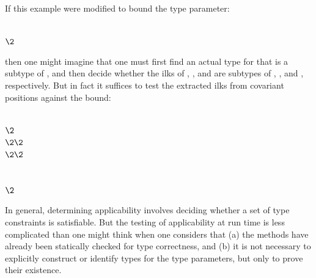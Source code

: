 If this example were modified to bound the type parameter:
\begin{codeexamplesize}
\begin{tabbing}
 \\
\(\2\)
\end{tabbing}
\end{codeexamplesize}
then one might imagine that one must first find an actual type  for  that is a subtype of ,
and then decide whether the ilks of , , and  are subtypes of , , and , respectively.
But in fact it suffices to test the extracted ilks from covariant positions against the bound:
\begin{codeexamplesize}
\begin{tabbing}
 \\
\(\2\) \\
\(\2\2\) \\
\(\2\2\)\EXP{\bigl(}\!\= \\
\>                       \\
\>                       \\
\(\2\)
\end{tabbing}
\end{codeexamplesize}

In general, determining applicability involves deciding whether a set of type constraints
is satisfiable.  But the testing of applicability at run time is less complicated
than one might think when one considers that (a) the methods have already been statically
checked for type correctness, and (b) it is not necessary to explicitly construct or identify
types for the type parameters, but only to prove their existence.

